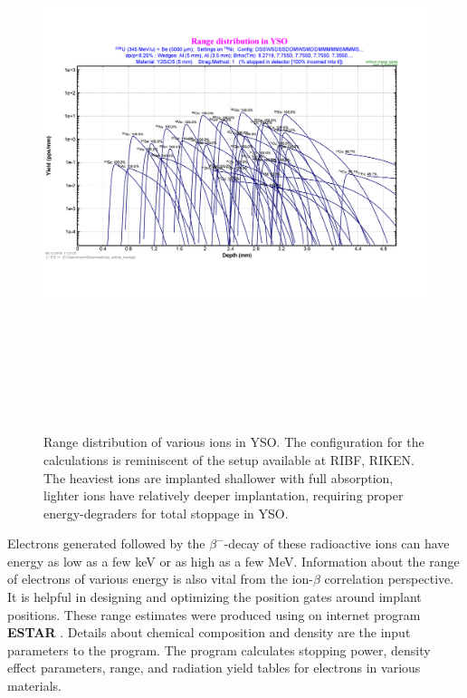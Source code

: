 \documentclass[a4paper,12pt,twoside]{report}
\begin{document}
\begin{figure}[h]
    \centering
    \includegraphics[height=16cm, width=17cm]{yso_lise_snapshot-rotated.pdf}
    \caption[Range distribution of various ions in YSO]{Range distribution of various ions in YSO. The configuration for the calculations is reminiscent of the setup available at RIBF, RIKEN. The heaviest ions are implanted shallower with full absorption, lighter ions have relatively deeper implantation, requiring proper energy-degraders for total stoppage in YSO. }
    \label{fig:ionrangeyso}
\end{figure}

Electrons generated followed by the $\beta^{-}$-decay of these radioactive ions can have energy as low as a few keV or as high as a few MeV. Information about the range of electrons of various energy is also vital from the ion-$\beta$ correlation perspective. It is helpful in designing and optimizing the position gates around implant positions. These range estimates were produced using on internet program \textbf{ESTAR} \cite{estar}. Details about chemical composition and density are the input parameters to the program. The program calculates  stopping power, density effect parameters, range, and radiation yield tables for electrons in various materials.
\end{document}
